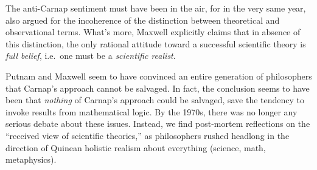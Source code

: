 The anti-Carnap sentiment must have been in the air, for in the very
same year, \cite{maxwell1962} also argued for the incoherence of the
distinction between theoretical and observational terms.  What's more,
Maxwell explicitly claims that in absence of this distinction, the
only rational attitude toward a successful scientific theory is {\it
  full belief}, i.e.\ one must be a \emph{scientific realist}.

Putnam and Maxwell seem to have convinced an entire generation of
philosophers that Carnap's approach cannot be salvaged.  In fact, the
conclusion seems to have been that {\it nothing} of Carnap's approach
could be salvaged, save the tendency to invoke results from
mathematical logic.  By the 1970s, there was no longer any serious
debate about these issues.  Instead, we find post-mortem reflections
on the ``received view of scientific theories,'' as philosophers
rushed headlong in the direction of Quinean holistic realism about
everything (science, math, metaphysics).













